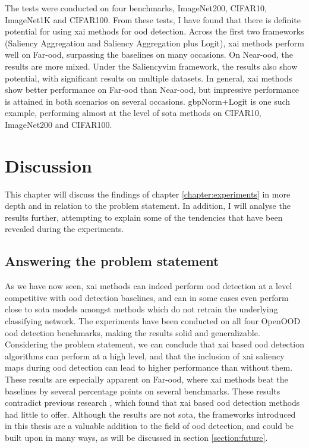 \documentclass[UKenglish]{uiomasterthesis} %
\theoremstyle{definition}
\begin{document}
The tests were conducted on four benchmarks, ImageNet200, CIFAR10, ImageNet1K and  CIFAR100. From these tests, I have found that there is definite potential for using \ac{xai} methods for \ac{ood} detection. Across the first two frameworks (Saliency Aggregation and Saliency Aggregation plus Logit), \ac{xai} methods perform well on Far-\ac{ood}, surpassing the baselines on many occasions. On Near-\ac{ood}, the results are more mixed. Under the Saliency\ac{vim} framework, the results also show potential, with significant results on multiple datasets. In general, \ac{xai} methods show better performance on Far-\ac{ood} than Near-\ac{ood}, but impressive performance is attained in both scenarios on several occasions. \ac{gbp}Norm+Logit is one such example, performing almost at the level of \ac{sota} methods on CIFAR10, ImageNet200 and CIFAR100.

\chapter{Discussion} \label{chapter:discussion}

This chapter will discuss the findings of chapter \ref{chapter:experiments} in more depth and in relation to the problem statement. In addition, I will analyse the results further, attempting to explain some of the tendencies that have been revealed during the experiments.

\section{Answering the problem statement}

As we have now seen, \ac{xai} methods can indeed perform \ac{ood} detection at a level competitive with \ac{ood} detection baselines, and can in some cases even perform close to \ac{sota} models amongst methods which do not retrain the underlying classifying network. The experiments have been conducted on all four OpenOOD \ac{ood} detection benchmarks, making the results solid and generalizable. Considering the problem statement, we can conclude that \ac{xai} based \ac{ood} detection algorithms can perform at a high level, and that the inclusion of \ac{xai} saliency maps during \ac{ood} detection can lead to higher performance than without them. These results are especially apparent on Far-\ac{ood}, where \ac{xai} methods beat the baselines by several percentage points on several benchmarks. These results contradict previous research \cite{martinez}, which found that \ac{xai} based \ac{ood} detection methods had little to offer. Although the results are not \ac{sota}, the frameworks introduced in this thesis are a valuable addition to the field of \ac{ood} detection, and could be built upon in many ways, as will be discussed in section \ref{section:future}.
\end{document}
